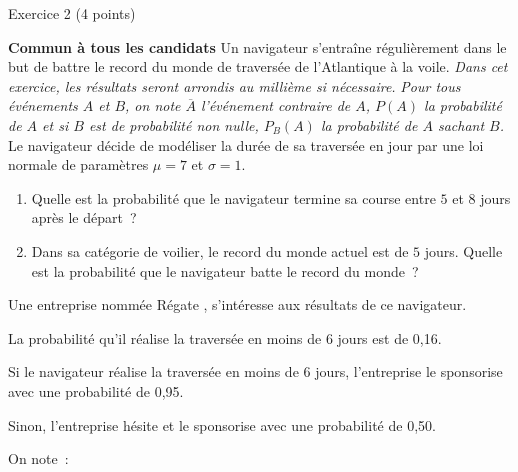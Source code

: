 
\begin{h2}Exercice 2 (4 points)\end{h2}
\par
\textbf{Commun  à tous les candidats}
\bigbreak
Un navigateur s'entraîne régulièrement dans le but de battre le record du monde de
traversée de l'Atlantique à la voile.
\medbreak
\emph{Dans cet exercice, les résultats seront arrondis au millième si nécessaire.}
\medbreak
\emph{Pour tous événements $A$ et $B$, on note $\overline{A}$ l'événement contraire de $A$, $P(A)$ la probabilité de $A$
et si $B$ est de probabilité non nulle, $P_B(A)$ la probabilité de $A$ sachant $B$.}
\bigbreak
{}
\medbreak
Le navigateur décide de modéliser la durée de sa traversée en jour par une loi normale de
paramètres $\mu = 7$ et $\sigma= 1$.
\medbreak
\begin{enumerate}
     \item Quelle est la probabilité que le navigateur termine sa course entre $5$ et $8$ jours après le départ~?
     \item Dans sa catégorie de voilier, le record du monde actuel est de $5$ jours.
     Quelle est la probabilité que le navigateur batte le record du monde~?
\end{enumerate}
\bigbreak
{}
\medbreak
Une entreprise nommée \og Régate \fg, s'intéresse aux résultats de ce navigateur.
\par
La probabilité qu'il réalise la traversée en moins de 6 jours est de 0,16.
\par
Si le navigateur réalise la traversée en moins de 6 jours, l'entreprise le sponsorise avec une probabilité de 0,95.
\par
Sinon, l'entreprise hésite et le sponsorise avec une probabilité de 0,50.
\par
On note~:

